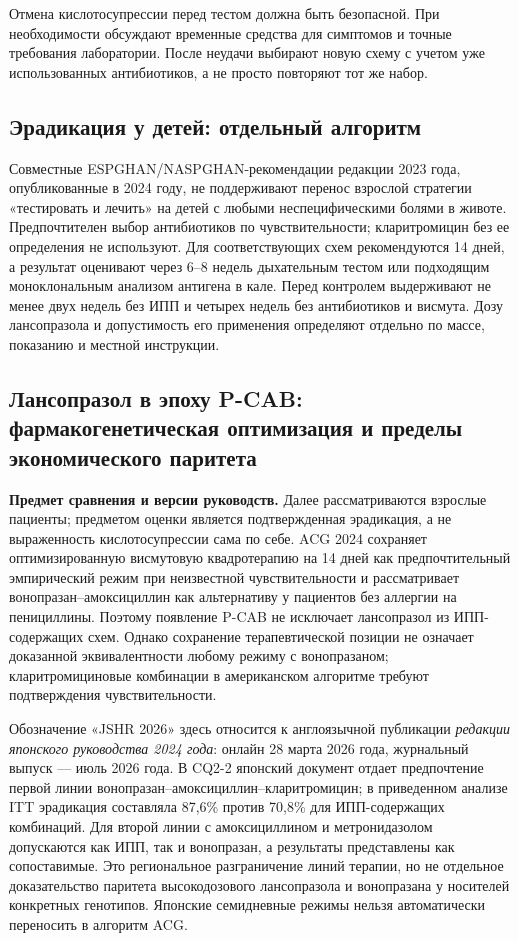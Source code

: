 \documentclass[11pt,a4paper,notitlepage]{report}
\newcommand{\src}[1]{\unskip\space\cite{#1}}
\begin{document}
Отмена кислотосупрессии перед тестом должна быть безопасной. При необходимости обсуждают временные средства для симптомов и точные требования лаборатории. После неудачи выбирают новую схему с учетом уже использованных антибиотиков, а не просто повторяют тот же набор.\src{acghighlights,khp}

\subsection{Эрадикация у детей: отдельный алгоритм}
\label{sec:hp-children}
Совместные ESPGHAN/NASPGHAN-рекомендации редакции 2023 года, опубликованные в 2024 году, не поддерживают перенос взрослой стратегии «тестировать и лечить» на детей с любыми неспецифическими болями в животе. Предпочтителен выбор антибиотиков по чувствительности; кларитромицин без ее определения не используют. Для соответствующих схем рекомендуются 14 дней, а результат оценивают через 6--8 недель дыхательным тестом или подходящим моноклональным анализом антигена в кале. Перед контролем выдерживают не менее двух недель без ИПП и четырех недель без антибиотиков и висмута. Дозу лансопразола и допустимость его применения определяют отдельно по массе, показанию и местной инструкции.\src{pedhp2024}

\subsection{Лансопразол в эпоху P-CAB: фармакогенетическая оптимизация и пределы экономического паритета}
\label{sec:hp-pcab-parity}
\textbf{Предмет сравнения и версии руководств.} Далее рассматриваются взрослые пациенты; предметом оценки является подтвержденная эрадикация, а не выраженность кислотосупрессии сама по себе. ACG 2024 сохраняет оптимизированную висмутовую квадротерапию на 14 дней как предпочтительный эмпирический режим при неизвестной чувствительности и рассматривает вонопразан--амоксициллин как альтернативу у пациентов без аллергии на пенициллины. Поэтому появление P-CAB не исключает лансопразол из ИПП-содержащих схем. Однако сохранение терапевтической позиции не означает доказанной эквивалентности любому режиму с вонопразаном; кларитромициновые комбинации в американском алгоритме требуют подтверждения чувствительности.\src{acghp,acghighlights}

Обозначение «JSHR 2026» здесь относится к англоязычной публикации \emph{редакции японского руководства 2024 года}: онлайн 28 марта 2026 года, журнальный выпуск --- июль 2026 года. В CQ2-2 японский документ отдает предпочтение первой линии вонопразан--амоксициллин--кларитромицин; в приведенном анализе ITT эрадикация составляла 87,6\% против 70,8\% для ИПП-содержащих комбинаций. Для второй линии с амоксициллином и метронидазолом допускаются как ИПП, так и вонопразан, а результаты представлены как сопоставимые. Это региональное разграничение линий терапии, но не отдельное доказательство паритета высокодозового лансопразола и вонопразана у носителей конкретных генотипов. Японские семидневные режимы нельзя автоматически переносить в алгоритм ACG.\src{jhp}
\end{document}

